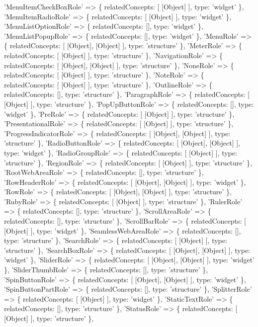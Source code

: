 \begin{DoxyCode}
  'MenuItemCheckBoxRole' => \{ relatedConcepts: [ [Object] ], type: 'widget' \},
  'MenuItemRadioRole' => \{ relatedConcepts: [ [Object] ], type: 'widget' \},
  'MenuListOptionRole' => \{ relatedConcepts: [], type: 'widget' \},
  'MenuListPopupRole' => \{ relatedConcepts: [], type: 'widget' \},
  'MenuRole' => \{ relatedConcepts: [ [Object], [Object] ], type: 'structure' \},
  'MeterRole' => \{ relatedConcepts: [ [Object] ], type: 'structure' \},
  'NavigationRole' => \{ relatedConcepts: [ [Object], [Object] ], type: 'structure' \},
  'NoneRole' => \{ relatedConcepts: [ [Object] ], type: 'structure' \},
  'NoteRole' => \{ relatedConcepts: [ [Object] ], type: 'structure' \},
  'OutlineRole' => \{ relatedConcepts: [], type: 'structure' \},
  'ParagraphRole' => \{ relatedConcepts: [ [Object] ], type: 'structure' \},
  'PopUpButtonRole' => \{ relatedConcepts: [], type: 'widget' \},
  'PreRole' => \{ relatedConcepts: [ [Object] ], type: 'structure' \},
  'PresentationalRole' => \{ relatedConcepts: [ [Object] ], type: 'structure' \},
  'ProgressIndicatorRole' => \{ relatedConcepts: [ [Object], [Object] ], type: 'structure' \},
  'RadioButtonRole' => \{ relatedConcepts: [ [Object], [Object] ], type: 'widget' \},
  'RadioGroupRole' => \{ relatedConcepts: [ [Object] ], type: 'structure' \},
  'RegionRole' => \{ relatedConcepts: [ [Object] ], type: 'structure' \},
  'RootWebAreaRole' => \{ relatedConcepts: [], type: 'structure' \},
  'RowHeaderRole' => \{ relatedConcepts: [ [Object], [Object] ], type: 'widget' \},
  'RowRole' => \{ relatedConcepts: [ [Object], [Object] ], type: 'structure' \},
  'RubyRole' => \{ relatedConcepts: [ [Object] ], type: 'structure' \},
  'RulerRole' => \{ relatedConcepts: [], type: 'structure' \},
  'ScrollAreaRole' => \{ relatedConcepts: [], type: 'structure' \},
  'ScrollBarRole' => \{ relatedConcepts: [ [Object] ], type: 'widget' \},
  'SeamlessWebAreaRole' => \{ relatedConcepts: [], type: 'structure' \},
  'SearchRole' => \{ relatedConcepts: [ [Object] ], type: 'structure' \},
  'SearchBoxRole' => \{ relatedConcepts: [ [Object], [Object] ], type: 'widget' \},
  'SliderRole' => \{ relatedConcepts: [ [Object], [Object] ], type: 'widget' \},
  'SliderThumbRole' => \{ relatedConcepts: [], type: 'structure' \},
  'SpinButtonRole' => \{ relatedConcepts: [ [Object], [Object] ], type: 'widget' \},
  'SpinButtonPartRole' => \{ relatedConcepts: [], type: 'structure' \},
  'SplitterRole' => \{ relatedConcepts: [ [Object] ], type: 'widget' \},
  'StaticTextRole' => \{ relatedConcepts: [], type: 'structure' \},
  'StatusRole' => \{ relatedConcepts: [ [Object] ], type: 'structure' \},

\end{DoxyCode}
